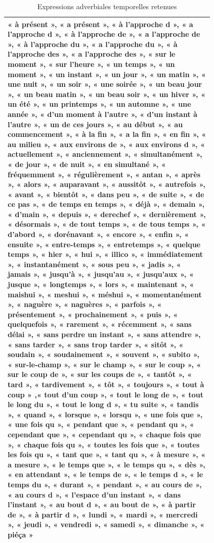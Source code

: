 \begin{table}[H]
\caption{Expressions adverbiales temporelles retenues}
\centering
\bigskip
\renewcommand{\arraystretch}{1.5} %
\begin{tabular}{|p{0.8\linewidth}|}
    \hline
    « à présent », « a présent », « à l'approche d », « a l'approche d », « à l'approche de », « a l'approche de », « à l'approche du », « a l'approche du », « à l'approche des », « a l'approche des », « sur le moment », « sur l'heure », « un temps », « un moment », « un instant », « un jour », « un matin », « une nuit », « un soir », « une soirée », « un beau jour », « un beau matin », « un beau soir », « un hiver », « un été », « un printemps », « un automne », « une année », « d'un moment à l'autre », « d'un instant à l'autre », « un de ces jours », « au début », « au commencement », « à la fin », « a la fin », « en fin », « au milieu », « aux environs de », « aux environs d », « actuellement », « anciennement », « simultanément », « de jour », « de nuit », « en simultané », « fréquemment », « régulièrement », « antan », « après », « alors », « auparavant », « aussitôt », « autrefois », « avant », « bientôt », « dans peu », « de suite », « de ce pas », « de temps en temps », « déjà », « demain », « d’main », « depuis », « derechef », « dernièrement », « désormais », « de tout temps », « de tous temps », « d'abord », « dorénavant », « encore », « enfin », « ensuite », « entre-temps », « entretemps », « quelque temps », « hier », « hui », « illico », « immédiatement », « instantanément », « sous peu », « jadis », « jamais », « jusqu'à », « jusqu'au », « jusqu'aux », « jusque », « longtemps », « lors », « maintenant », « maishui », « meshui », « méshui », « momentanément », « naguère », « naguères », « parfois », « présentement », « prochainement », « puis », « quelquefois », « rarement », « récemment », « sans délai », « sans perdre un instant », « sans attendre », « sans tarder », « sans trop tarder », « sitôt », « soudain », « soudainement », « souvent », « subito », « sur-le-champ », « sur le champ », « sur le coup », « sur le coup de », « sur les coups de », « tantôt », « tard », « tardivement », « tôt », « toujours », « tout à coup » ,« tout d'un coup », « tout le long de », « tout le long du », « tout le long d », « tu suite », « tandis », « quand », « lorsque », « lorsqu », « une fois que », « une fois qu », « pendant que », « pendant qu », « cependant que », « cependant qu », « chaque fois que », « chaque fois qu », « toutes les fois que », « toutes les fois qu », « tant que », « tant qu », « à mesure », « a mesure », « le temps que », « le temps qu », « dès », « en attendant », « le temps de », « le temps d », « le temps du », « durant », « pendant », « au cours de », « au cours d », « l'espace d'un instant », « dans l'instant », « au bout d », « au bout de », « à partir de », « à partir d », « lundi », « mardi », « mercredi », « jeudi », « vendredi »,  « samedi », « dimanche », « piéça » \\
    \hline
\end{tabular}
 \label{Tab:adv_temp}
\end{table}

